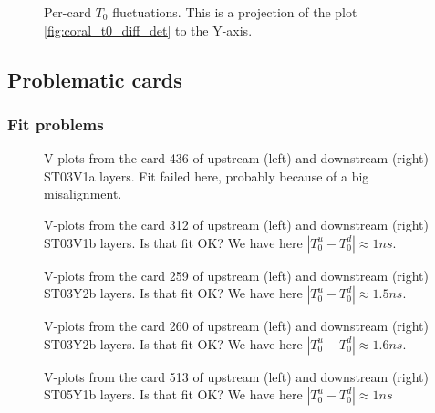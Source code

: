 \documentclass[a4paper,12pt]{article}
\begin{document}
\begin{figure}[ht]
\centering
\caption{Per-card $T_0$ fluctuations.
This is a projection of the plot \ref{fig:coral_t0_diff_det} to the Y-axis.}
\label{fig:coral_t0_diff}
\epsfxsize=233pt 
\end{figure}

\clearpage

\subsection{Problematic cards}
\subsubsection{Fit problems}

\begin{figure}[ht]
\centering
\caption{V-plots from the card 436 of upstream (left) and downstream (right) ST03V1a layers.
Fit failed here, probably because of a big misalignment.}
\label{fig:Vs_ST03V1a_card436}
\epsfxsize=255pt 
\end{figure}

\begin{figure}[ht]
\centering
\caption{V-plots from the card 312 of upstream (left) and downstream (right) ST03V1b layers.
Is that fit OK? We have here $|T_0^u-T_0^d| \approx 1 ns$. }
\label{fig:Vs_ST03V1b_card312}
\epsfxsize=255pt 
\end{figure}

\begin{figure}[ht]
\centering
\caption{V-plots from the card 259 of upstream (left) and downstream (right) ST03Y2b layers.
Is that fit OK? We have here $|T_0^u-T_0^d| \approx 1.5 ns$. }
\label{fig:Vs_ST03Y2b_card259}
\epsfxsize=255pt 
\end{figure}

\begin{figure}[ht]
\centering
\caption{V-plots from the card 260 of upstream (left) and downstream (right) ST03Y2b layers.
Is that fit OK? We have here $|T_0^u-T_0^d| \approx 1.6 ns$. }
\label{fig:Vs_ST03Y2b_card260}
\epsfxsize=255pt 
\end{figure}

\begin{figure}[ht]
\centering
\caption{V-plots from the card 513 of upstream (left) and downstream (right) ST05Y1b layers.
Is that fit OK? We have here $|T_0^u-T_0^d| \approx 1 ns$}
\label{fig:Vs_ST05Y1b_card513}
\epsfxsize=255pt 
\end{figure}
\end{document}
